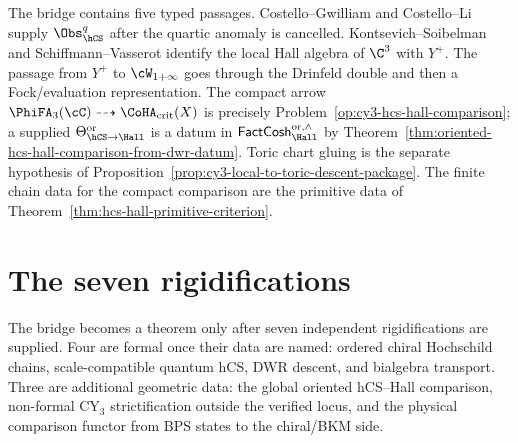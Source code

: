 \begin{remark}
\label{rem:cy3-chain-level-comparison-diagram}
The bridge contains five typed passages. Costello--Gwilliam and
Costello--Li supply $\Obs_{\hCS}^{q}$ after the quartic anomaly is
cancelled. Kontsevich--Soibelman and Schiffmann--Vasserot identify the
local Hall algebra of $\C^3$ with $Y^+$. The passage from $Y^+$ to
$\cW_{1+\infty}$ goes through the Drinfeld double and then a
Fock/evaluation representation. The compact arrow
$\PhiFA_3(\cC)\dashrightarrow\CoHA_{\mathrm{crit}}(X)$ is precisely
Problem~\ref{op:cy3-hcs-hall-comparison}; a supplied
$\Theta_{\hCS\to\Hall}^{\mathrm{or}}$ is a datum in
$\mathsf{FactCosh}_{\Hall}^{\mathrm{or},\wedge}$ by
Theorem~\ref{thm:oriented-hcs-hall-comparison-from-dwr-datum}.
Toric chart gluing is the separate hypothesis of
Proposition~\ref{prop:cy3-local-to-toric-descent-package}. The finite
chain data for the compact comparison are the primitive data of
Theorem~\ref{thm:hcs-hall-primitive-criterion}.
\end{remark}

\section{The seven rigidifications}
\label{sec:cy3-seven-rigidifications}

The bridge becomes a theorem only after seven independent
rigidifications are supplied. Four are formal once their data are
named: ordered chiral Hochschild chains, scale-compatible quantum hCS,
DWR descent, and bialgebra transport. Three are additional geometric data:
the global oriented hCS--Hall comparison, non-formal CY$_3$
strictification outside the verified locus, and the physical comparison
functor from BPS states to the chiral/BKM side.

